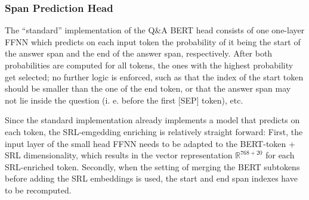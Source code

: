 \subsubsection{Span Prediction Head}

The ``standard'' implementation of the Q\&A BERT head consists of one one-layer FFNN which predicts
on each input token the probability of it being the start of the answer span and the end of the
answer span, respectively. After both probabilities are computed for all tokens, the ones with
the highest probability get selected; no further logic is enforced, such as that the index of
the start token should be smaller than the one of the end token, or that the answer span may
not lie inside the question (i. e. before the first [SEP] token), etc.

Since the standard implementation already implements a model that predicts on each token,
the SRL-emgedding enriching is relatively straight forward:
First, the input layer of the small head FFNN needs to be adapted to the BERT-token + SRL
dimensionality, which results in the vector representation $\mathbb{R}^{768+20}$ for each
SRL-enriched token. Secondly, when the setting of merging the BERT subtokens before adding
the SRL embeddings is used, the start and end span indexes have to be recomputed.





